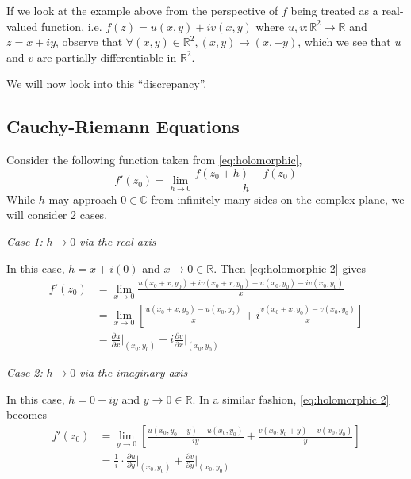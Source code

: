 \documentclass[11pt, oneside]{book}
\begin{document}
\begin{note}
	If we look at the example above from the perspective of $f$ being treated as a real-valued function, i.e. $f(z) = u(x, y) + iv(x, y)$ where $u, v: \mathbb{R}^2 \to \mathbb{R}$ and $z = x + iy$, observe that $\forall (x, y) \in \mathbb{R}^2, (x, y) \mapsto (x, -y)$, which we see that $u$ and $v$ are partially differentiable in $\mathbb{R}^2$.

	We will now look into this ``discrepancy''.
\end{note}

\subsection{Cauchy-Riemann Equations} %
\label{sub:cauchy_riemann_equations}


Consider the following function taken from \cref{eq:holomorphic},
\begin{equation}\label{eq:holomorphic 2}
	f'(z_0) = \lim_{h \to 0} \frac{f(z_0 + h) - f(z_0)}{h}
\end{equation}
While $h$ may approach $0 \in \mathbb{C}$ from infinitely many sides on the complex plane, we will consider 2 cases.

\textit{Case 1: }$\mathit{h \to 0}$\textit{ via the real axis}

In this case, $h = x + i(0)$ and $x \to 0 \in \mathbb{R}$. Then \cref{eq:holomorphic 2} gives
\begin{align}
	f'(z_0) &= \lim_{x \to 0} \frac{u(x_0 + x, y_0) + iv(x_0 + x, y_0) - u(x_0, y_0) - iv(x_0, y_0)}{x} \nonumber \\
		&= \lim_{x \to 0} \left[ \frac{u(x_0 + x, y_0) - u(x_0, y_0)}{x} + i \frac{v(x_0 + x, y_0) - v(x_0, y_0)}{x} \right] \nonumber \\
		&= \frac{\partial u}{\partial x} \Bigr|_{(x_0, y_0)} + i \frac{\partial v}{\partial x} \Bigr|_{(x_0, y_0)} \label{eq:holomorphic approach via real axis}
\end{align}

\textit{Case 2: }$\mathit{h \to 0}$\textit{ via the imaginary axis}

In this case, $h = 0 + iy$ and $y \to 0 \in \mathbb{R}$. In a similar fashion, \cref{eq:holomorphic 2} becomes
\begin{align}
	f'(z_0) &= \lim_{y \to 0} \left[ \frac{u(x_0, y_0 + y) - u(x_0, y_0)}{iy} + \frac{v(x_0, y_0 + y) - v(x_0, y_0)}{y} \right] \nonumber \\
		&= \frac{1}{i} \cdot \frac{\partial u}{\partial y} \Bigr|_{(x_0, y_0)} + \frac{\partial v}{\partial y} \Bigr|_{(x_0, y_0)} \label{eq:holomorphic approach via imaginary axis}
\end{align}
\end{document}
